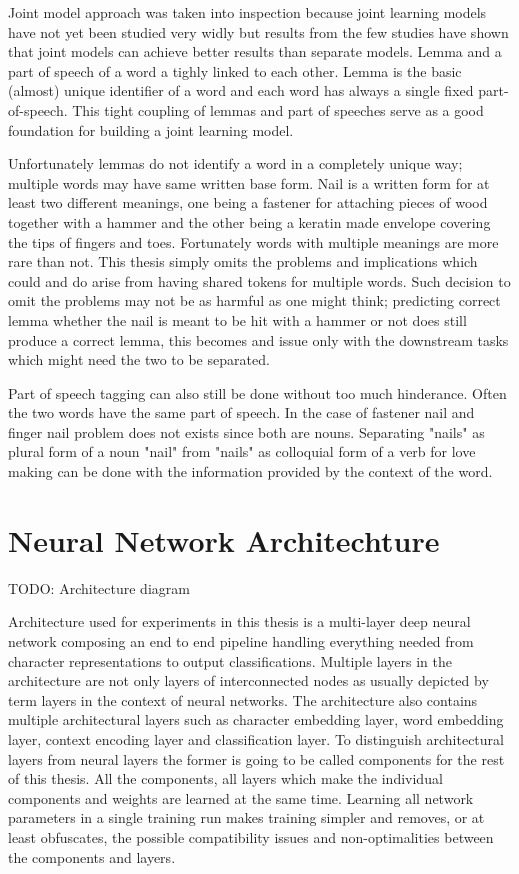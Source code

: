 \documentclass[12pt,a4paper,english
]{tutthesis}
\newcommand\todo[1]{{\color{red}TODO: #1}} %
\begin{document}
Joint model approach was taken into inspection because joint learning models have not yet been studied very widly but results from the few studies have shown that joint models can achieve better results than separate models. Lemma and a part of speech of a word a tighly linked to each other. Lemma is the basic (almost) unique identifier of a word and each word has always a single fixed part-of-speech. This tight coupling of lemmas and part of speeches serve as a good foundation for building a joint learning model. 

Unfortunately lemmas do not identify a word in a completely unique way; multiple words may have same written base form. Nail is a written form for at least two different meanings, one being a fastener for attaching pieces of wood together with a hammer and the other being a keratin made envelope covering the tips of fingers and toes. Fortunately words with multiple meanings are more rare than not. This thesis simply omits the problems and implications which could and do arise from having shared tokens for multiple words. Such decision to omit the problems may not be as harmful as one might think; predicting correct lemma whether the nail is meant to be hit with a hammer or not does still produce a correct lemma, this becomes and issue only with the downstream tasks which might need the two to be separated.

Part of speech tagging can also still be done without too much hinderance. Often the two words have the same part of speech. In the case of fastener nail and finger nail problem does not exists since both are nouns. Separating "nails" as plural form of a noun "nail" from "nails" as colloquial form of a verb for love making can be done with the information provided by the context of the word.


\section{Neural Network Architechture}
\label{se:architecture}
\todo{Architecture diagram}

Architecture used for experiments in this thesis is a multi-layer deep neural network composing an end to end pipeline handling everything needed from character representations to output classifications. Multiple layers in the architecture are not only layers of interconnected nodes as usually depicted by term layers in the context of neural networks. The architecture also contains multiple architectural layers such as character embedding layer, word embedding layer, context encoding layer and classification layer. To distinguish architectural layers from neural layers the former is going to be called components for the rest of this thesis. All the components, all layers which make the individual components and weights are learned at the same time. Learning all network parameters in a single training run makes training simpler and removes, or at least obfuscates, the possible compatibility issues and non-optimalities between the components and layers.
\end{document}
